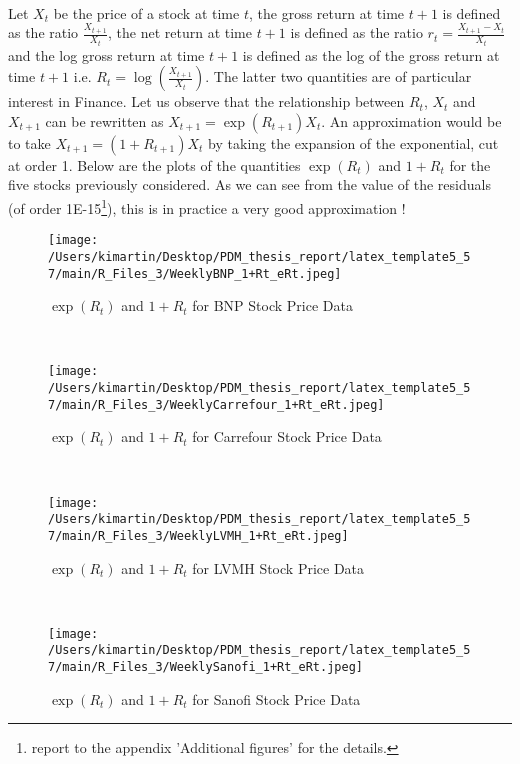 \paragraph{}
Let $X_t$ be the price of a stock at time $t$, the gross return at time $t + 1$ is defined as the ratio $\frac{X_{t+1}}{X_t}$, the net return at time $t + 1$ is defined as the ratio $r_t = \frac{X_{t+1}-X_t}{X_t}$ and the log gross return at time $t +1$ is defined as the log of the gross return at time $t + 1$ i.e. $R_t = \log(\frac{X_{t+1}}{X_t})$. The latter two quantities are of particular interest in Finance. 
\newline
Let us observe that the relationship between $R_t$, $X_t$ and $X_{t+1}$ can be rewritten as $X_{t+1} = \exp(R_{t+1}) X_t$. An approximation would be to take $X_{t+1} = (1 + R_{t+1}) X_t$ by taking the expansion of the exponential, cut at order 1. Below are the plots of the quantities $\exp(R_t)$ and $1 + R_t$ for the five stocks previously considered. As we can see from the value of the residuals (of order 1E-15\footnote{report to the appendix 'Additional figures' for the details.}), this is in practice a very good approximation !
\begin{figure}[h!]
	\centering
	\begin{minipage}[b]{0.4\textwidth}
		\centering
		\texttt{[image: /Users/kimartin/Desktop/PDM\_thesis\_report/latex\_template5\_57/main/R\_Files\_3/WeeklyBNP\_1+Rt\_eRt.jpeg]}
		\caption{$\exp(R_t)$ and $1 + R_t$ for BNP Stock Price Data}
		\label{fig:BNPCompApproxStock}
	\end{minipage}
	~
	\begin{minipage}[b]{0.4\textwidth}
		\centering
		\texttt{[image: /Users/kimartin/Desktop/PDM\_thesis\_report/latex\_template5\_57/main/R\_Files\_3/WeeklyCarrefour\_1+Rt\_eRt.jpeg]}
		\caption{$\exp(R_t)$ and $1 + R_t$ for Carrefour Stock Price Data}
		\label{fig:CarrefourCompApproxStock}
	\end{minipage}
\end{figure}
\\
\begin{figure}[h!]
	\centering
	\begin{minipage}[b]{0.4\textwidth}
		\centering
		\texttt{[image: /Users/kimartin/Desktop/PDM\_thesis\_report/latex\_template5\_57/main/R\_Files\_3/WeeklyLVMH\_1+Rt\_eRt.jpeg]}
		\caption{$\exp(R_t)$ and $1 + R_t$ for LVMH Stock Price Data}
		\label{fig:LVMHCompApproxStock}
	\end{minipage}
	~
	\begin{minipage}[b]{0.4\textwidth}
		\centering
		\texttt{[image: /Users/kimartin/Desktop/PDM\_thesis\_report/latex\_template5\_57/main/R\_Files\_3/WeeklySanofi\_1+Rt\_eRt.jpeg]}
		\caption{$\exp(R_t)$ and $1 + R_t$ for Sanofi Stock Price Data}
		\label{fig:SanofiCompApproxStock}
	\end{minipage}
\end{figure}
